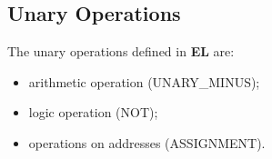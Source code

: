 \subsection*{Unary Operations}

The unary operations defined in \textbf{EL} are:

\begin{itemize}

	\item arithmetic operation (UNARY_MINUS);
	
	\item logic operation (NOT);
	
	\item operations on addresses (ASSIGNMENT).
	
\end{itemize}


